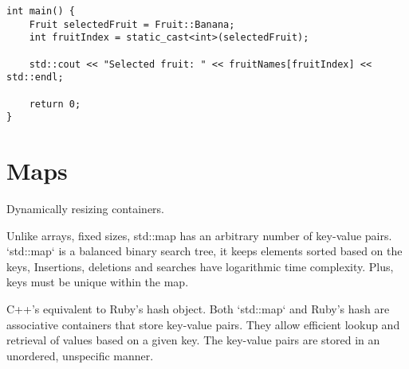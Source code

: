 \documentclass[openany]{report}
\begin{document}
\begin{verbatim}
int main() {
    Fruit selectedFruit = Fruit::Banana;
    int fruitIndex = static_cast<int>(selectedFruit);

    std::cout << "Selected fruit: " << fruitNames[fruitIndex] << std::endl;

    return 0;
}
\end{verbatim}


\section{Maps}

Dynamically resizing containers.

Unlike arrays, fixed sizes, std::map has an arbitrary number of key-value pairs.
`std::map` is a balanced binary search tree, it keeps elements sorted based on the keys, 
Insertions, deletions and searches have logarithmic time complexity.
Plus, keys must be unique within the map.

C++'s equivalent to Ruby's hash object. 
Both `std::map` and Ruby's hash are associative containers that store key-value pairs.
They allow efficient lookup and retrieval of values based on a given key.
The key-value pairs are stored in an unordered, unspecific manner.
\end{document}
